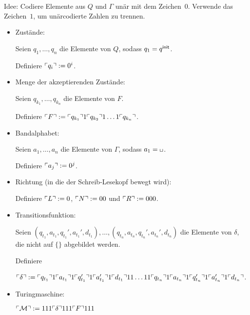 Idee: Codiere Elemente aus $Q$ und $\Gamma$ unär mit dem Zeichen~$0$.
Verwende das Zeichen~$1$, um unärcodierte Zahlen zu trennen.

\begin{itemize}
 \item Zustände:
 
    Seien $q_1,\dots, q_{n}$ die Elemente von $Q$, sodass $q_1=q^\mathsf{init}$.
    
    Definiere $\ulcorner q_i \urcorner:=0^i$.
    
  \item Menge der akzeptierenden Zustände:
  
    Seien $q_{k_1},\dots, q_{k_n}$ die Elemente von $F$.
    
    Definiere $\ulcorner F \urcorner:=\ulcorner q_{k_1} \urcorner 1 \ulcorner q_{k_2} \urcorner 1 \ldots 1 \ulcorner q_{k_n} \urcorner$.
    
  \item Bandalphabet:
  
    Seien $a_1,\dots, a_{n}$ die Elemente von $\Gamma$, sodass $a_1=\blank$.
    
    Definiere $\ulcorner a_j \urcorner:=0^j$.
    
  \item Richtung (in die der Schreib-Lesekopf bewegt wird):
  
    Definiere $\ulcorner L \urcorner:=0$, $\ulcorner N \urcorner:=00$ und $\ulcorner R \urcorner:=000$.
    
  \item Transitionsfunktion:
  
   Seien $(q_{t_1}, a_{t_1}, q_{t_1}', a_{t_1}', d_{t_1}),\dots, (q_{t_n}, a_{t_n}, q_{t_n}', a_{t_n}', d_{t_n})$ 
   die Elemente von $\delta$, die nicht auf $\{\}$ abgebildet werden.
  
   Definiere
   
   $\ulcorner \delta \urcorner:= \ulcorner q_{t_1} \urcorner1\ulcorner a_{t_1} \urcorner1\ulcorner q_{t_1}' \urcorner1\ulcorner a_{t_1}' \urcorner1\ulcorner d_{t_1} \urcorner11\dots 11 \ulcorner q_{t_n} \urcorner1\ulcorner a_{t_n} \urcorner1\ulcorner q_{t_n}' \urcorner1 \ulcorner a_{t_n}' \urcorner1\ulcorner d_{t_n} \urcorner$.
   
   \item Turingmaschine:
   
   $\ulcorner \mathcal{M} \urcorner:=111\ulcorner \delta \urcorner111\ulcorner F \urcorner111$
\end{itemize}


